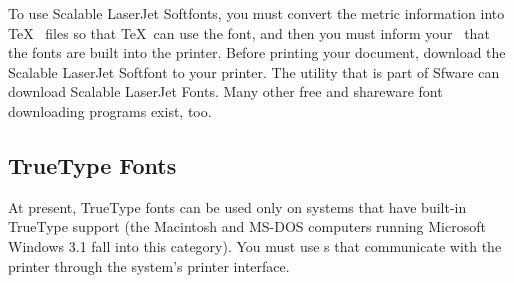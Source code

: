To use Scalable LaserJet Softfonts, you must convert the metric
information into \TeX\  files so that \TeX\ can use the
font, and then you must inform your \dvidriver\ that the fonts
are built into the printer.  Before printing your document, download
the Scalable LaserJet Softfont to your printer.  The 
utility that is part of Sfware can download Scalable LaserJet Fonts.
Many other free and shareware font downloading programs exist, too.

\subsection{TrueType Fonts}

At present, TrueType fonts can 
be used only on systems that have built-in
TrueType support (the Macintosh and MS-DOS computers running Microsoft
Windows 3.1 fall into this category).  You must use \dvidriver{}s that
communicate with the printer through the system's printer interface.


